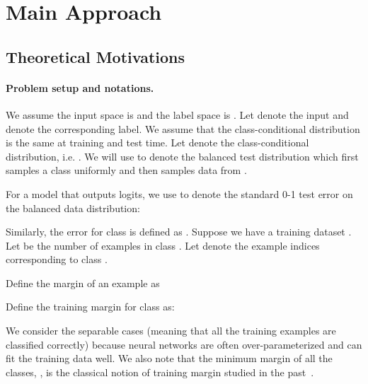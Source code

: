 \documentclass{article}
\begin{document}
\section{Main Approach}

\newcommand{\R}{\mathbb{R}}
\renewcommand{\P}{\mathcal{P}}
\newcommand{\pdata}{\P}
\newcommand{\E}{\mathbb{E}}
\newcommand{\Lerror}{L_{\textup{bal}}}

\newcommand{\comp}{\textup{C}}
\newcommand{\cF}{\mathcal{F}}
\subsection{Theoretical Motivations}\label{sec:theory}

\paragraph{Problem setup and notations.}
We assume the input space is  and the label space is . Let  denote the input and  denote the corresponding label. We assume that the class-conditional distribution  is the same at training and test time. Let  denote the class-conditional distribution, i.e. . We will use  to denote the balanced test distribution which first samples a class uniformly and then samples data from . 

For a model  that outputs  logits, we use  to denote the standard 0-1 test error on the balanced data distribution:


Similarly, the error  for class  is defined as . Suppose we have a training dataset .  Let  be the number of examples in class . Let  denote the example indices corresponding to class . 



Define the margin of an example  as 


Define the training margin for class  as:

We  consider the separable cases (meaning that all the training examples are classified correctly) because neural networks are often over-parameterized and can fit the training data well. 
We also note that the minimum margin of all the classes,  , is the classical notion of training margin studied in the past~\citep{koltchinskii2002empirical}. 
\end{document}
